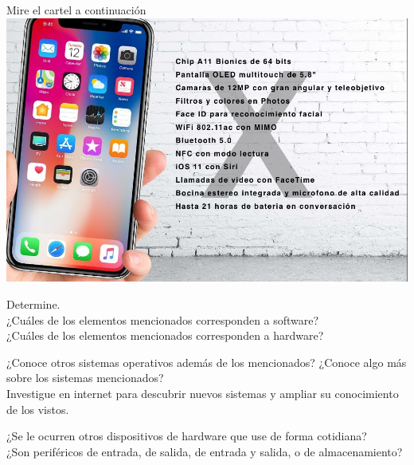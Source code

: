 \begin{exercise}
Mire el cartel a continuación\\
\includegraphics[scale=0.38]{capitulos/computadoras/imagenes/iphone_x_specs.png}

Determine.\\
¿Cuáles de los elementos mencionados corresponden a software?\\
¿Cuáles de los elementos mencionados corresponden a hardware?
\end{exercise}

\begin{exercise}
¿Conoce otros sistemas operativos además de los mencionados? ¿Conoce algo más
sobre los sistemas mencionados?\\
Investigue en internet para descubrir nuevos sistemas y ampliar su conocimiento
de los vistos.
\end{exercise}

\begin{exercise}
¿Se le ocurren otros dispositivos de hardware que use de forma cotidiana?\\
¿Son periféricos de entrada, de salida, de entrada y salida, o de almacenamiento?
\end{exercise}

